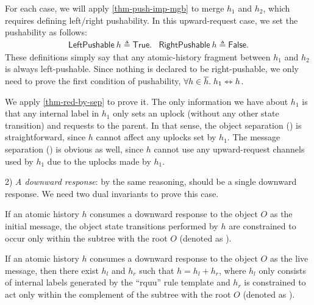 For each case, we will apply \autoref{thm-push-imp-mgb} to merge $h_1$ and $h_2$, which requires defining left/right pushability.
In this upward-request case, we set the pushability as follows:
\begin{displaymath}
  \renewcommand{\arraystretch}{1.2}
  \begin{array}{lr}
    \mathsf{LeftPushable}\ h \triangleq \mathsf{True}. &
    \mathsf{RightPushable}\ h \triangleq \mathsf{False}.
  \end{array}
\end{displaymath}
These definitions simply say that any atomic-history fragment between $h_1$ and $h_2$ is always left-pushable.
Since nothing is declared to be right-pushable, we only need to prove the first condition of pushability, \ie{} $\forall h \in \overline{h}.\; h_1 \leftrightarrowtriangle h$.

We apply \autoref{thm-red-by-sep} to prove it.
The only information we have about $h_1$ is that any internal label in $h_1$ only sets an uplock (without any other state transition) and requests to the parent.
In that sense, the object separation () is straightforward, since $h$ cannot affect any uplocks set by $h_1$.
The message separation () is obvious as well, since $h$ cannot use any upward-request channels used by $h_1$ due to the uplocks made by $h_1$.

2) \emph{A downward response}: by the same reasoning,  should be a single downward response.
We need two dual invariants to prove this case.
\begin{invariant}\label{inv-downward-rs-init}
  If an atomic history $h$ consumes a downward response to the object $O$ as the initial message, the object state transitions performed by $h$ are constrained to occur only within the subtree with the root $O$ (denoted as ).
\end{invariant}
\begin{invariant}\label{inv-downward-rs-live}
  If an atomic history $h$ consumes a downward response to the object $O$ as the live message, then there exist $h_l$ and $h_r$ such that $h = h_l + h_r$, where $h_l$ only consists of internal labels generated by the ``rquu'' rule template and $h_r$ is constrained to act only within the complement of the subtree with the root $O$ (denoted as ).
\end{invariant}

